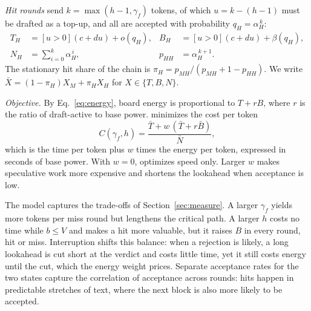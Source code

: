 \emph{Hit rounds} send $k=\max(h-1,\gamma_f)$ tokens, of which $u=k-(h-1)$ must be drafted as a top-up, and all are accepted with probability $q_H=\alpha_H^{\,k}$:
\begin{align}
T_H &= [u>0](c+du)+o(q_H), & B_H &= [u>0](c+du)+\beta(q_H),\nonumber\\
N_H &= \textstyle\sum_{i=0}^{k}\alpha_H^{\,i}, & p_{HH} &= \alpha_H^{\,k+1}.\label{eq:hit}
\end{align}
The stationary hit share of the chain is $\pi_H=p_{MH}/(p_{MH}+1-p_{HH})$. We write $\bar X=(1-\pi_H)X_M+\pi_H X_H$ for $X\in\{T,B,N\}$.

\emph{Objective.} By Eq.~\eqref{eq:energy}, board energy is proportional to $T+rB$, where $r$ is the ratio of draft-active to base power. \cape{} minimizes the cost per token
\begin{equation}
C(\gamma_f,h)=\frac{\bar T+w\,(\bar T+r\bar B)}{\bar N},\label{eq:objective}
\end{equation}
which is the time per token plus $w$ times the energy per token, expressed in seconds of base power. With $w=0$, \cape{} optimizes speed only. Larger $w$ makes speculative work more expensive and shortens the lookahead when acceptance is low.

The model captures the trade-offs of Section~\ref{sec:measure}. A larger $\gamma_f$ yields more tokens per miss round but lengthens the critical path. A larger $h$ costs no time while $b\le V$ and makes a hit more valuable, but it raises $B$ in every round, hit or miss. Interruption shifts this balance: when a rejection is likely, a long lookahead is cut short at the verdict and costs little time, yet it still costs energy until the cut, which the energy weight prices. Separate acceptance rates for the two states capture the correlation of acceptance across rounds: hits happen in predictable stretches of text, where the next block is also more likely to be accepted.

